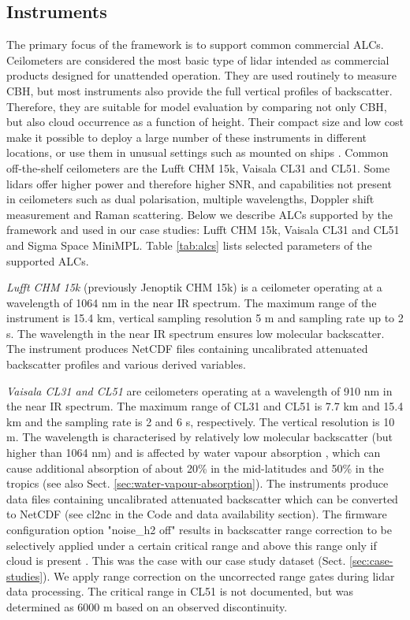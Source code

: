\subsection{Instruments}
\label{sec:alcs}

The primary focus of the framework is to support common commercial ALCs.
Ceilometers are considered the most basic type of lidar \citep{emeis2010,kotthaus2016}
intended as commercial products designed for unattended operation.
They are used routinely to measure CBH, but most instruments also provide the
full vertical profiles of backscatter. Therefore, they are suitable for model
evaluation by comparing not only CBH, but also cloud occurrence as a function
of height. Their compact size and low cost make it possible to deploy a large
number of these instruments in different locations, or use them in unusual settings
such as mounted on ships \citep{klekociuk2019,kuma2019}. Common off-the-shelf
ceilometers are
the Lufft CHM 15k, Vaisala CL31 and CL51.
Some lidars offer higher power
and therefore higher SNR, and capabilities not present in ceilometers such as
dual polarisation, multiple wavelengths, Doppler shift measurement and Raman scattering.
Below we describe ALCs supported by the framework and used in our case studies:
Lufft CHM 15k, Vaisala CL31 and CL51 and Sigma Space MiniMPL.
Table \ref{tab:alcs} lists selected parameters of the supported ALCs.

\textit{Lufft CHM 15k} (previously Jenoptik CHM 15k) is a ceilometer operating
at a wavelength of 1064 nm in the
near IR spectrum. The maximum range of the instrument is 15.4 km, vertical sampling
resolution 5 m and sampling rate up to 2 s. The wavelength in the near IR
spectrum ensures low molecular backscatter.
The instrument produces NetCDF files containing uncalibrated attenuated
backscatter profiles and various derived variables.

\textit{Vaisala CL31 and CL51} are ceilometers operating at a wavelength of 910
nm in the near IR spectrum. The maximum range of CL31 and CL51 is 7.7 km and 15.4 km
and the sampling rate is 2 and 6 s, respectively. The vertical resolution
is 10 m. The wavelength is characterised by relatively low molecular backscatter
(but higher than 1064 nm) and is affected by water vapour absorption
\citep{wiegner2015,wiegner2019}, which can cause additional absorption of about 
20\% in the mid-latitudes and 50\% in the tropics (see also Sect. \ref{sec:water-vapour-absorption}).
The instruments produce
data files containing uncalibrated attenuated backscatter which can be converted
to NetCDF (see cl2nc in the Code and data availability section).
The firmware configuration option "noise\_h2 off" results in backscatter
range correction to be selectively applied under a certain critical range
and above this range only if cloud is present \citep[Sect. 3.2]{kotthaus2016}.
This was the case with our case study dataset (Sect. \ref{sec:case-studies}).
We apply range correction on the uncorrected range gates during lidar
data processing. The critical range in CL51 is not documented, but was
determined as 6000 m based on an observed discontinuity.


